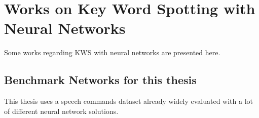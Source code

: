 
\section{Works on Key Word Spotting with Neural Networks}\label{sec:prev_kws}
Some works regarding KWS with neural networks are presented here.

\subsection{Benchmark Networks for this thesis}\label{sec:prev_kws_benchmark}
This thesis uses a speech commands dataset \cite{Warden2018} already widely evaluated with a lot of different neural network solutions.


